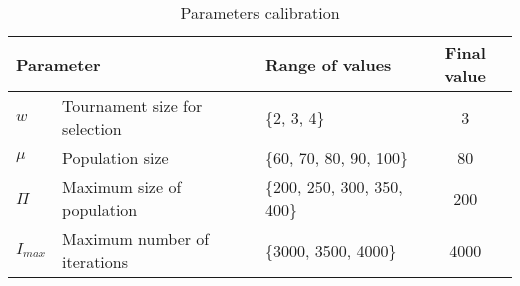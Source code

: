 \begin{table}[]
\centering
\begin{tabular}{@{}lllc@{}}
\toprule
\multicolumn{2}{l}{Parameter}           & Range of values             & Final value \\ \midrule
$w$     & Tournament size for selection & \{2, 3, 4\}                 & 3           \\
$\mu$   & Population size               & \{60, 70, 80, 90, 100\}     & 80          \\
$\Pi$   & Maximum size of population    & \{200, 250, 300, 350, 400\} & 200         \\
$I_{max}$ & Maximum number of iterations  & \{3000, 3500, 4000\}        & 4000        \\ \bottomrule
\end{tabular}
\caption{Parameters calibration}
\label{calibration}
\end{table}